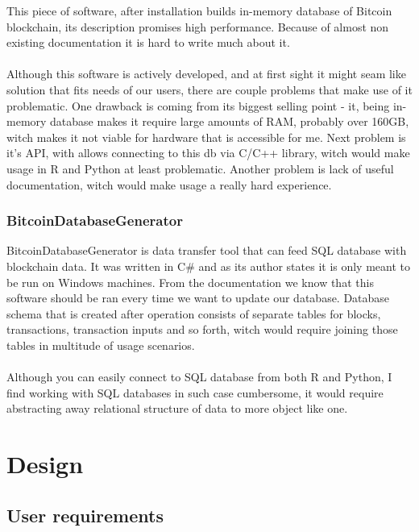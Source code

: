 \documentclass[12pt, en, eng]{mgr}
\begin{document}
This piece of software, after installation builds in-memory database of Bitcoin blockchain, its description promises high performance. Because of almost non existing documentation it is hard to write much about it.
\\
\\
Although this software is actively developed, and at first sight it might seam like solution that fits needs of our users, there are couple problems that make use of it problematic. One drawback is coming from its biggest selling point - it, being in-memory database makes it require large amounts of RAM, probably over 160GB, witch makes it not viable for hardware that is accessible for me. Next problem is it's API, with allows connecting to this db via C/C++ library, witch would make usage in R and Python at least problematic. Another problem is lack of useful documentation, witch would make usage a really hard experience.

\subsubsection*{BitcoinDatabaseGenerator}

BitcoinDatabaseGenerator is data transfer tool that can feed SQL database with blockchain data. It was written in C\# and as its author states it is only meant to be run on Windows machines. From the documentation we know that this software should be ran every time we want to update our database. Database schema that is created after operation consists of separate tables for blocks, transactions, transaction inputs and so forth, witch would require joining those tables in multitude of usage scenarios.
\\
\\
Although you can easily connect to SQL database from both R and Python, I find working with SQL databases in such case cumbersome, it would require abstracting away relational structure of data to more object like one. 


\section{Design}

\subsection{User requirements}
\end{document}
